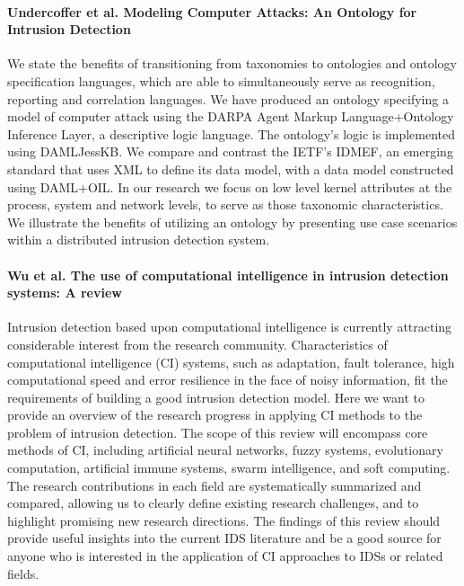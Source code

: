 \paragraph*{Undercoffer et al. Modeling Computer Attacks: An Ontology for Intrusion Detection}
\cite{undercoffer2003modeling}
We state the benefits of transitioning from taxonomies to ontologies and ontology specification languages, which are able to simultaneously serve as recognition, reporting and correlation languages. We have produced an ontology specifying a model of computer attack using the DARPA Agent Markup Language+Ontology Inference Layer, a descriptive logic language. The ontology’s logic is implemented using DAMLJessKB. We compare and contrast the IETF’s IDMEF, an emerging standard that uses XML to define its data model, with a data model constructed using DAML+OIL. In our research we focus on low level kernel attributes at the process, system and network levels, to serve as those taxonomic characteristics. We illustrate the benefits of utilizing an ontology by presenting use case scenarios within a distributed intrusion detection system.

\paragraph*{Wu et al. The use of computational intelligence in intrusion detection systems: A review}
\cite{wu2010use}
Intrusion detection based upon computational intelligence is currently attracting considerable interest from the research community. Characteristics of computational intelligence (CI) systems, such as adaptation, fault tolerance, high computational speed and error resilience in the face of noisy information, fit the requirements of building a good intrusion detection model. Here we want to provide an overview of the research progress in applying CI methods to the problem of intrusion detection. The scope of this review will encompass core methods of CI, including artificial neural networks, fuzzy systems, evolutionary computation, artificial immune systems, swarm intelligence, and soft computing. The research contributions in each field are systematically summarized and compared, allowing us to clearly define existing research challenges, and to highlight promising new research directions. The findings of this review should provide useful insights into the current IDS literature and be a good source for anyone who is interested in the application of CI approaches to IDSs or related fields.

